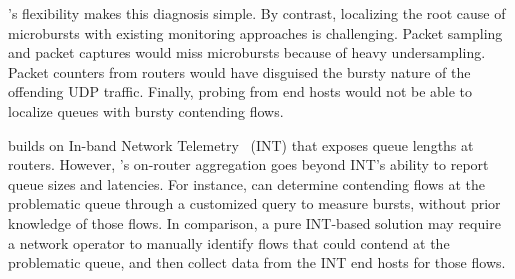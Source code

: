 \TheSystem's flexibility makes this diagnosis simple.  By contrast, localizing
the root cause of microbursts with existing monitoring approaches is
challenging.  Packet sampling and packet captures would miss microbursts
because of heavy undersampling. Packet counters from routers would have
disguised the bursty nature of the offending UDP traffic. Finally, probing from
end hosts would not be able to localize queues with bursty contending flows.

\TheSystem builds on In-band Network Telemetry~\cite{int, barefoot-demo} (INT)
that exposes queue lengths at routers. However, \TheSystem's on-router
aggregation goes beyond INT's ability to report queue sizes and latencies. For
instance, \TheSystem can determine contending flows at the problematic queue
through a customized query to measure bursts, without prior knowledge of those
flows. In comparison, a pure INT-based solution may require a network operator
to manually identify flows that could contend at the problematic queue, and
then collect data from the INT end hosts for those flows.
